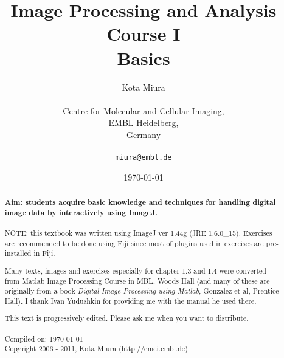 \title{Image Processing and Analysis Course I\\
Basics}
\author{Kota Miura\\
\\
  Centre for Molecular and Cellular Imaging,\\
  EMBL Heidelberg,\\
  Germany\\
\\
\texttt{miura@embl.de}
}

\date{\today}

\pagestyle{empty}
\titleTH
\clearpage
\pagestyle{fancyplain}
\begin{abstract}
\HRule

\textbf{Aim: students acquire basic knowledge and techniques for handling
digital image data by interactively using ImageJ.} \\
\\

NOTE: this textbook was written using ImageJ ver 1.44g (JRE 1.6.0\_15).
Exercises are recommended to be done using Fiji since most of
plugins used in exercises are pre-installed in Fiji. 

Many texts, images
and exercises especially for chapter 1.3 and 1.4 were converted from
Matlab Image Processing Course in MBL, Woods Hall (and many of these are
originally from a book \textit{Digital Image Processing
using Matlab}, Gonzalez et al, Prentice Hall). I
thank Ivan Yudushkin for providing me with the manual he used there. 

This text
is progressively edited. Please ask me when you want to distribute. \\
\\
Compiled on: \today \\
Copyright 2006 - 2011, Kota Miura (http://cmci.embl.de)

\HRule
\end{abstract}